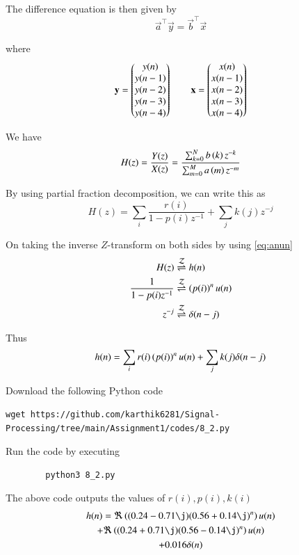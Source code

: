 \documentclass[journal,12pt,twocolumn]{IEEEtran}
\renewcommand\thesection{\arabic{section}}
\begin{document}
\begin{enumerate}[label=\thesection.\arabic*]
	The difference equation is then given by
	\begin{equation}
		\vec{a}^\top \vec{y} = \vec{b}^\top \vec{x} 
	\end{equation}
	
	where
	\begin{align}
		\mathbf{y} = \begin{pmatrix}y(n) \\ y(n-1) \\ y(n-2) \\ y(n-3) \\ y(n-4)\end{pmatrix} \qquad
		\mathbf{x} = \begin{pmatrix}x(n) \\ x(n-1) \\ x(n-2) \\ x(n-3) \\ x(n-4)\end{pmatrix}
	\end{align}
	
	We have
	\begin{equation}
		H(z) = \frac{Y(z)}{X(z)} = \frac{\sum _{k=0}^{N}b\left(k\right) z^{-k}}{\sum _{m=0}^{M}a\left(m\right) z^{-m}}
	\end{equation}
	
	By using partial fraction decomposition, we can write this as
	\begin{equation}
		H(z) = \sum_i \frac{r(i)}{1-p(i)z^{-1}} + \sum_j k(j)z^{-j}
	\end{equation}
	
	On taking the inverse $Z$-transform on both sides by using \eqref{eq:anun}
	\begin{align}
		H(z) &\overset{\mathcal{Z}}{ \rightleftharpoons} h(n) \\
		\frac{1}{1-p(i)z^{-1}} &\overset{\mathcal{Z}}{ \rightleftharpoons} \left(p(i)\right)^nu(n) \\
		z^{-j} &\overset{\mathcal{Z}}{ \rightleftharpoons} \delta(n-j) 
	\end{align}
	
	Thus
	\begin{align}
		h(n) = \sum_i r(i)\left(p(i)\right)^nu(n) + \sum_j k(j)\delta(n-j)
	\end{align}
	
Download the following Python code
	\begin{lstlisting}
wget https://github.com/karthik6281/Signal-Processing/tree/main/Assignment1/codes/8_2.py
	\end{lstlisting}
	
	Run the code by executing
	\begin{lstlisting}
		python3 8_2.py
	\end{lstlisting}
	
	The above code outputs the values of $r(i), p(i), k(i)$
	\begin{multline}
		h(n) = 
		\Re\brak{(0.24 - 0.71\j)(0.56 + 0.14\j)^n} u(n) \\
		+ \Re\brak{(0.24 + 0.71\j)(0.56 - 0.14\j)^n} u(n) \\
		+ 0.016\delta(n)
	\end{multline}
	

\end{enumerate}
\end{document}
